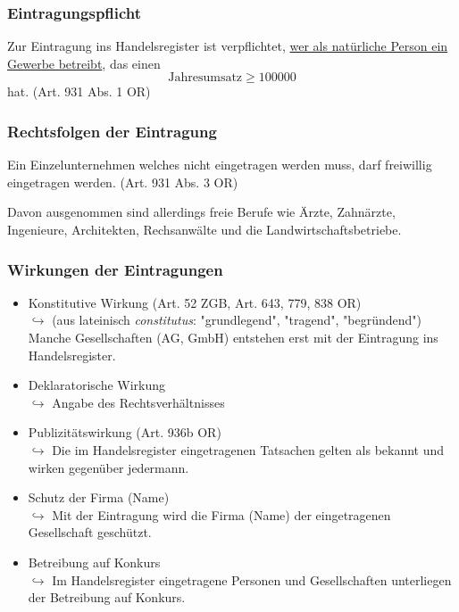 \documentclass[12pt]{article}
\begin{document}
\subsubsection{Eintragungspflicht}
Zur Eintragung ins Handelsregister ist verpflichtet, \underline{wer als natürliche Person ein Gewerbe betreibt}, das einen
\begin{equation*}
    \text{Jahresumsatz}  \geq 100000
\end{equation*}
hat. (Art. 931 Abs. 1 OR)

\subsubsection{Rechtsfolgen der Eintragung}
Ein Einzelunternehmen welches nicht eingetragen werden muss, darf freiwillig eingetragen werden.
(Art. 931 Abs. 3 OR)

Davon ausgenommen sind allerdings freie Berufe wie Ärzte, Zahnärzte, Ingenieure, Architekten, Rechsanwälte und die Landwirtschaftsbetriebe.

\newpage
\subsubsection{Wirkungen der Eintragungen}
\begin{itemize}
    \item Konstitutive Wirkung (Art. 52 ZGB, Art. 643, 779, 838 OR)\\
    $\hookrightarrow$ (aus lateinisch \textit{constitutus}: "grundlegend", "tragend", "begründend") Manche Gesellschaften (AG, GmbH) entstehen erst mit der Eintragung ins Handelsregister.
    \item Deklaratorische Wirkung\\
    $\hookrightarrow$ Angabe des Rechtsverhältnisses
    \item Publizitätswirkung (Art. 936b OR)\\
    $\hookrightarrow$ Die im Handelsregister eingetragenen Tatsachen gelten als bekannt und wirken gegenüber jedermann.
    \item Schutz der Firma (Name)\\
    $\hookrightarrow$ Mit der Eintragung wird die Firma (Name) der eingetragenen Gesellschaft geschützt.
    \item Betreibung auf Konkurs\\
    $\hookrightarrow$ Im Handelsregister eingetragene Personen und Gesellschaften unterliegen der Betreibung auf Konkurs.
\end{itemize}
\end{document}
